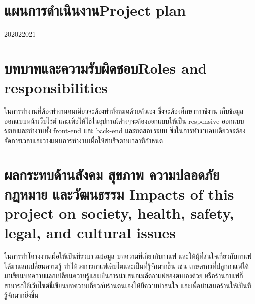 \section{\ifcpe แผนการดำเนินงาน\else Project plan\fi}

\begin{plan}{6}{2020}{2}{2021}
\end{plan}

\section{\ifcpe บทบาทและความรับผิดชอบ\else Roles and responsibilities\fi}
ในการทำงานที่ต้องทำงานคนเดียวจะต้องทำทั้งหมดด้วยตัวเอง ซึ่งจะต้องศึกษาการช้งาน เก็บข้อมูล ออกแบบหน้าเว็บไซต์ และเพื่อให้ใช้ในอุปกรณ์ต่างๆจะต้องออกแบบให้เป็น responsive ออกแบบระบบและทำงานทั้ง front-end และ back-end และทดสอบระบบ ซึ่งในการทำงานคนเดียวจะต้องจัดการเวลาและวางแผนการทำงานเผื่อให้สำเร็จตามเวลาที่กำหนด

\section{\ifcpe%
ผลกระทบด้านสังคม สุขภาพ ความปลอดภัย กฎหมาย และวัฒนธรรม
\else%
Impacts of this project on society, health, safety, legal, and cultural issues
\fi}
ในการทำโครงงานเผื่อให้เป็นที่รวบรวมข้อมูล บทความที่เกี่ยวกับกาแฟ และให้ผู้ที่สนใจเกี่ยวกับกาแฟได้มาแลกเปลี่ยนความรู้ ทำให้วงการกาแฟเติบโตและเป็นที่รู้จักมากขึ้น เช่น เกษตรกรที่ปลูกกาแฟได้มาเขียนบทความแลกเปลี่ยนความรู้และเป็นการนำเสนอเมล็ดกาแฟของตนเองด้วย หรือร้านกาแฟก็สามารถใช้เว็บไซต์นี้เขียนบทความเกี่ยวกับร้านตนเองให้มีความน่าสนใจ และเพื่อนำเสนอร้านให้เป็นที่รู้จักมากยิ่งขึ้น
